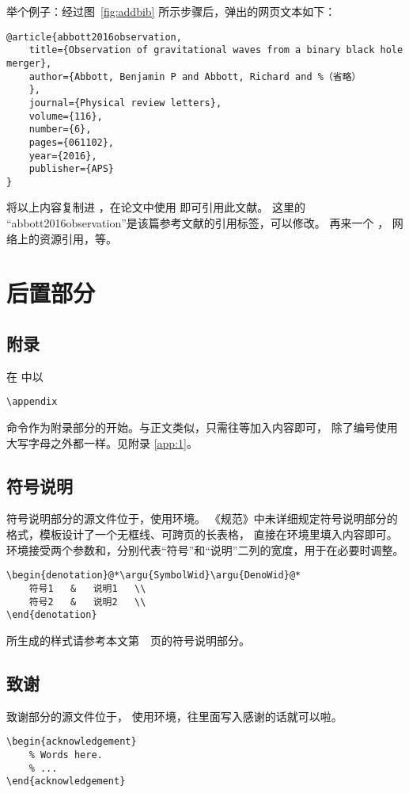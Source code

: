 举个例子：经过图~\ref{fig:addbib} 所示步骤后，弹出的网页文本如下：
\begin{lstlisting}
@article{abbott2016observation,
	title={Observation of gravitational waves from a binary black hole merger},
	author={Abbott, Benjamin P and Abbott, Richard and %（省略）
	},
	journal={Physical review letters},
	volume={116},
	number={6},
	pages={061102},
	year={2016},
	publisher={APS}
}
	\end{lstlisting}
将以上内容复制进 ，在论文中使用
即可引用此文献。
这里的 “abbott2016observation”是该篇参考文献的引用标签，可以修改。
再来一个\cite{ashirov2008tetramerization} ，
网络上的资源引用\cite{buctthesis}，等。


\section{后置部分}\label{sec:backmatter}
\subsection{附录}\label{sec:app}
在  中以
\begin{lstlisting}[numbers=none]
\appendix
		\end{lstlisting}
命令作为附录部分的开始。与正文类似，只需往等加入内容即可，
除了编号使用大写字母之外都一样。见附录 \ref{app:1}。

\subsection{符号说明}\label{sec:deno}
符号说明部分的源文件位于，使用环境。
《规范》中未详细规定符号说明部分的格式，模板设计了一个无框线、可跨页的长表格，
直接在环境里填入内容即可。
环境接受两个参数和，分别代表“符号”和“说明”二列的宽度，用于在必要时调整。

\begin{lstlisting}
\begin{denotation}@*\argu{SymbolWid}\argu{DenoWid}@*
	符号1   &   说明1   \\
	符号2   &   说明2   \\
\end{denotation}
		\end{lstlisting}
所生成的样式请参考本文第~\pageref{chap*:deno}~页的符号说明部分。

\subsection{致谢}
致谢部分的源文件位于，
使用环境，往里面写入感谢的话就可以啦。
\begin{lstlisting}
\begin{acknowledgement}
	% Words here.
	% ...
\end{acknowledgement}
		\end{lstlisting}

